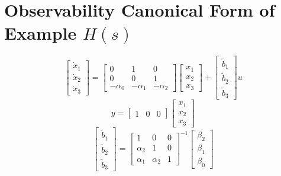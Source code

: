\documentclass[10pt,a4paper,oneside]{article}
\begin{document}
\section{Observability Canonical Form of Example $H(s)$}
\[
\left[\begin{array}{c}{\dot{x}_{1}} \\ {\dot{x}_{2}} \\ {\dot{x}_{3}}\end{array}\right]=\left[\begin{array}{rrr}{0} & {1} & {0} \\ {0} & {0} & {1} \\ {-\alpha_{0}} & {-\alpha_{1}} & {-\alpha_{2}}\end{array}\right]\left[\begin{array}{l}{x_{1}} \\ {x_{2}} \\ {x_{3}}\end{array}\right]+\left[\begin{array}{c}{\tilde{b}_{1}} \\ {\tilde{b}_{2}} \\ {\tilde{b}_{3}}\end{array}\right] u
\]
\[
y=\left[\begin{array}{lll}{1} & {0} & {0}\end{array}\right]\left[\begin{array}{l}{x_{1}} \\ {x_{2}} \\ {x_{3}}\end{array}\right]
\]
\[
\left[\begin{array}{c}{\tilde{b}_{1}} \\ {\tilde{b}_{2}} \\ {\tilde{b}_{3}}\end{array}\right]=\left[\begin{array}{ccc}{1} & {0} & {0} \\ {\alpha_{2}} & {1} & {0} \\ {\alpha_{1}} & {\alpha_{2}} & {1}\end{array}\right]^{-1}\left[\begin{array}{c}{\beta_{2}} \\ {\beta_{1}} \\ {\beta_{0}}\end{array}\right]
\]
\end{document}
